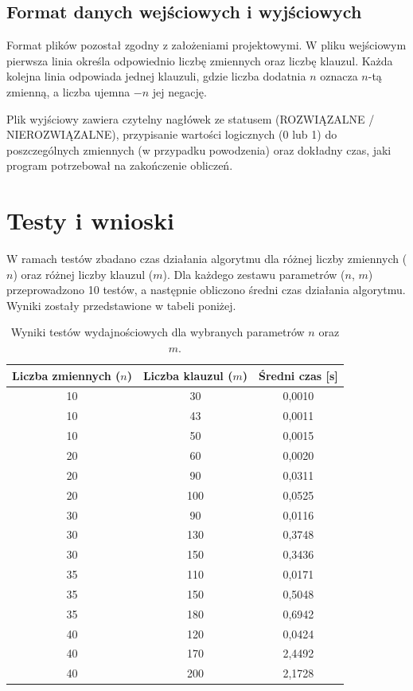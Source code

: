 \documentclass[11pt,a4paper]{article}
\theoremstyle{definition}
\begin{document}
\subsection{Format danych wejściowych i wyjściowych}
Format plików pozostał zgodny z założeniami projektowymi. W pliku wejściowym pierwsza linia określa odpowiednio liczbę zmiennych oraz liczbę klauzul. Każda kolejna linia odpowiada jednej klauzuli, gdzie liczba dodatnia $n$ oznacza $n$-tą zmienną, a liczba ujemna $-n$ jej negację. 

Plik wyjściowy zawiera czytelny nagłówek ze statusem (ROZWIĄZALNE / NIEROZWIĄZALNE), przypisanie wartości logicznych (0 lub 1) do poszczególnych zmiennych (w przypadku powodzenia) oraz dokładny czas, jaki program potrzebował na zakończenie obliczeń.


\section{Testy i wnioski}
W ramach testów zbadano czas działania algorytmu dla różnej liczby zmiennych ($n$) oraz różnej liczby klauzul ($m$).
Dla każdego zestawu parametrów ($n$, $m$) przeprowadzono 10 testów, a następnie obliczono średni czas działania algorytmu. Wyniki zostały przedstawione w tabeli poniżej.
\begin{table}[!ht]
\centering
\begin{tabular}{|c|c|c|}
\hline
\textbf{Liczba zmiennych ($n$)} & \textbf{Liczba klauzul ($m$)} & \textbf{Średni czas [s]} \\ \hline
10 & 30 & 0,0010 \\ \hline
10 & 43 & 0,0011 \\ \hline
10 & 50 & 0,0015 \\ \hline
20 & 60 & 0,0020 \\ \hline
20 & 90 & 0,0311 \\ \hline
20 & 100 & 0,0525 \\ \hline
30 & 90 & 0,0116 \\ \hline
30 & 130 & 0,3748 \\ \hline
30 & 150 & 0,3436 \\ \hline
35 & 110 & 0,0171 \\ \hline
35 & 150 & 0,5048 \\ \hline
35 & 180 & 0,6942 \\ \hline
40 & 120 & 0,0424 \\ \hline
40 & 170 & 2,4492 \\ \hline
40 & 200 & 2,1728 \\ \hline
\end{tabular}
\caption{Wyniki testów wydajnościowych dla wybranych parametrów $n$ oraz $m$.}
\end{table}
\end{document}
